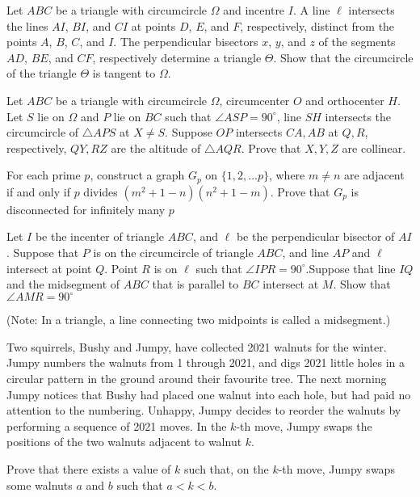 \documentclass[11pt]{scrartcl}
\begin{document}
\begin{problem}[719467452801051]
Let $ABC$ be a triangle with circumcircle $\Omega$ and incentre $I$. A line $\ell$ intersects the lines $AI$, $BI$, and $CI$ at points $D$, $E$, and $F$, respectively, distinct from the points $A$, $B$, $C$, and $I$. The perpendicular bisectors $x$, $y$, and $z$ of the segments $AD$, $BE$, and $CF$, respectively determine a triangle $\Theta$. Show that the circumcircle of the triangle $\Theta$ is tangent to $\Omega$.
\end{problem}
\begin{problem}[3417358984411200361]
Let $ABC$ be a triangle with circumcircle $\Omega$, circumcenter $O$ and orthocenter $H$. Let $S$ lie on $\Omega$ and $P$ lie on $BC$ such that $\angle ASP=90^\circ$, line $SH$ intersects the circumcircle of $\triangle APS$ at $X\neq S$. Suppose $OP$ intersects $CA,AB$ at $Q,R$, respectively, $QY,RZ$ are the altitude of $\triangle AQR$. Prove that $X,Y,Z$ are collinear.
\end{problem}
\begin{problem}[409146991986056]
For each prime $p$, construct a graph $G_p$ on $\{1,2,\ldots p\}$, where $m\neq n$ are adjacent if and only if $p$ divides $(m^{2} + 1-n)(n^{2} + 1-m)$. Prove that $G_p$ is disconnected for infinitely many $p$
\end{problem}
\begin{problem}[908587245178389]
Let $I$ be the incenter of triangle $ABC$, and $\ell$ be the perpendicular bisector of $AI$. Suppose that $P$ is on the circumcircle of triangle $ABC$, and line $AP$ and $\ell$ intersect at point $Q$. Point $R$ is on $\ell$ such that $\angle IPR = 90^{\circ}$.Suppose that line $IQ$ and the midsegment of $ABC$ that is parallel to $BC$ intersect at $M$. Show that $\angle AMR = 90^{\circ}$

(Note: In a triangle, a line connecting two midpoints is called a midsegment.)
\end{problem}
\begin{problem}[669395675904242]
	Two squirrels, Bushy and Jumpy, have collected 2021 walnuts for the winter. Jumpy numbers the walnuts from 1 through 2021, and digs 2021 little holes in a circular pattern in the ground around their favourite tree. The next morning Jumpy notices that Bushy had placed one walnut into each hole, but had paid no attention to the numbering. Unhappy, Jumpy decides to reorder the walnuts by performing a sequence of 2021 moves. In the $k$-th move, Jumpy swaps the positions of the two walnuts adjacent to walnut $k$.

Prove that there exists a value of $k$ such that, on the $k$-th move, Jumpy swaps some walnuts $a$ and $b$ such that $a<k<b$.
\end{problem}
\end{document}
